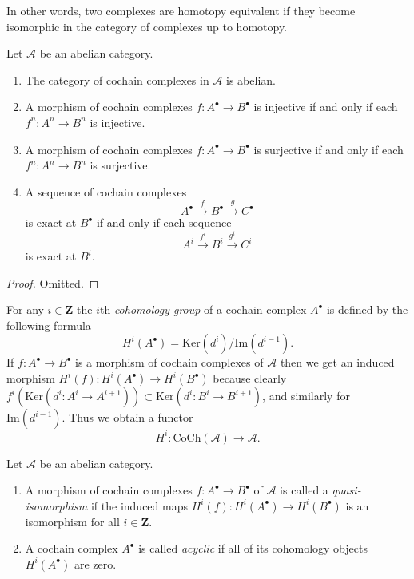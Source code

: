 \noindent
In other words, two complexes are homotopy equivalent if they become
isomorphic in the category of complexes up to homotopy.

\begin{lemma}
\label{lemma-cat-cochain-abelian}
Let $\mathcal{A}$ be an abelian category.
\begin{enumerate}
\item The category of cochain complexes in $\mathcal{A}$ is
abelian.
\item A morphism of cochain complexes
$f : A^\bullet \to B^\bullet$ is injective
if and only if each $f^n : A^n \to B^n$ is injective.
\item A morphism of cochain complexes
$f : A^\bullet \to B^\bullet$ is surjective
if and only if each $f^n : A^n \to B^n$ is surjective.
\item A sequence of cochain complexes
$$
A^\bullet \xrightarrow{f} B^\bullet \xrightarrow{g} C^\bullet
$$
is exact at $B^\bullet$ if and only if each sequence
$$
A^i \xrightarrow{f^i} B^i \xrightarrow{g^i} C^i
$$
is exact at $B^i$.
\end{enumerate}
\end{lemma}

\begin{proof}
Omitted.
\end{proof}

\noindent
For any $i \in \mathbf{Z}$ the $i$th {\it cohomology group}
of a cochain complex $A^\bullet$ is defined by
the following formula
$$
H^i(A^\bullet) = \text{Ker}(d^i)/\text{Im}(d^{i - 1}).
$$
If $f : A^\bullet \to B^\bullet$ is a morphism of cochain
complexes of $\mathcal{A}$ then we get an induced
morphism $H^i(f) : H^i(A^\bullet) \to H^i(B^\bullet)$
because clearly
$f^i(\text{Ker}(d^i : A^i \to A^{i + 1})) \subset
\text{Ker}(d^i : B^i \to B^{i + 1})$, and similarly
for $\text{Im}(d^{i - 1})$.
Thus we obtain a functor
$$
H^i : \text{CoCh}(\mathcal{A}) \longrightarrow \mathcal{A}.
$$

\begin{definition}
\label{definition-quasi-isomorphism-cochain}
Let $\mathcal{A}$ be an abelian category.
\begin{enumerate}
\item A morphism of cochain complexes $f : A^\bullet \to B^\bullet$
of $\mathcal{A}$ is called a {\it quasi-isomorphism} if the induced
maps $H^i(f) : H^i(A^\bullet) \to H^i(B^\bullet)$
is an isomorphism for all $i \in \mathbf{Z}$.
\item A cochain complex $A^\bullet$ is called
{\it acyclic} if all of its cohomology objects
$H^i(A^\bullet)$ are zero.
\end{enumerate}
\end{definition}

